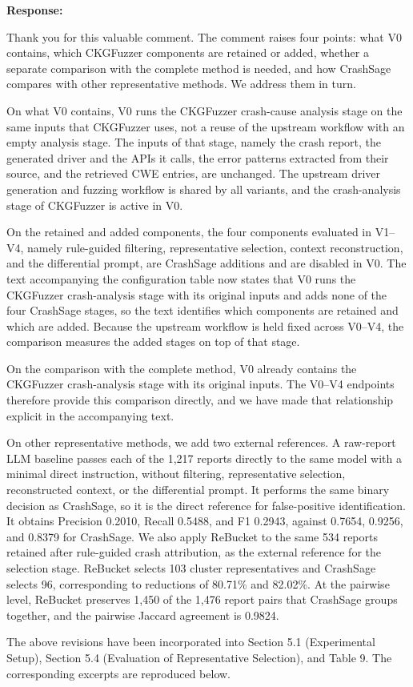\documentclass[onecolumn,11pt]{article}
\newcommand{\secr}[2]{\par\mySep \noindent \textsf{\textbf{#1 }}{#2}\par}
\newcommand{\mySep}{\vspace{8pt}}
\begin{document}
\secr{Response:}{Thank you for this valuable comment. The comment raises four points: what V0 contains, which CKGFuzzer components are retained or added, whether a separate comparison with the complete method is needed, and how CrashSage compares with other representative methods. We address them in turn.

On what V0 contains, V0 runs the CKGFuzzer crash-cause analysis stage on the same inputs that CKGFuzzer uses, not a reuse of the upstream workflow with an empty analysis stage. The inputs of that stage, namely the crash report, the generated driver and the APIs it calls, the error patterns extracted from their source, and the retrieved CWE entries, are unchanged. The upstream driver generation and fuzzing workflow is shared by all variants, and the crash-analysis stage of CKGFuzzer is active in V0.

On the retained and added components, the four components evaluated in V1--V4, namely rule-guided filtering, representative selection, context reconstruction, and the differential prompt, are CrashSage additions and are disabled in V0. The text accompanying the configuration table now states that V0 runs the CKGFuzzer crash-analysis stage with its original inputs and adds none of the four CrashSage stages, so the text identifies which components are retained and which are added. Because the upstream workflow is held fixed across V0--V4, the comparison measures the added stages on top of that stage.

On the comparison with the complete method, V0 already contains the CKGFuzzer crash-analysis stage with its original inputs. The V0--V4 endpoints therefore provide this comparison directly, and we have made that relationship explicit in the accompanying text.

On other representative methods, we add two external references. A raw-report LLM baseline passes each of the 1,217 reports directly to the same model with a minimal direct instruction, without filtering, representative selection, reconstructed context, or the differential prompt. It performs the same binary decision as CrashSage, so it is the direct reference for false-positive identification. It obtains Precision 0.2010, Recall 0.5488, and F1 0.2943, against 0.7654, 0.9256, and 0.8379 for CrashSage. We also apply ReBucket to the same 534 reports retained after rule-guided crash attribution, as the external reference for the selection stage. ReBucket selects 103 cluster representatives and CrashSage selects 96, corresponding to reductions of 80.71\% and 82.02\%. At the pairwise level, ReBucket preserves 1,450 of the 1,476 report pairs that CrashSage groups together, and the pairwise Jaccard agreement is 0.9824.

The above revisions have been incorporated into Section 5.1 (Experimental Setup), Section 5.4 (Evaluation of Representative Selection), and Table 9. The corresponding excerpts are reproduced below.}
\end{document}

